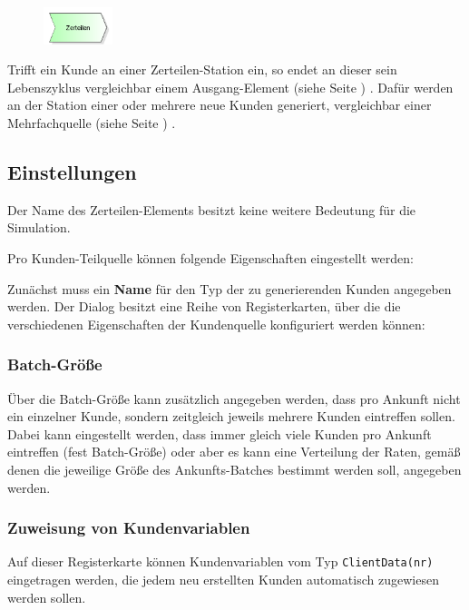 \begin{figure}
\vspace{-22pt}
\includegraphics[width=2cm]{imageModelElementSplit.png}
\vspace{-22pt}
\end{figure}

Trifft ein Kunde an einer Zerteilen-Station ein, so endet an dieser sein
Lebenszyklus vergleichbar einem Ausgang-Element (siehe Seite \pageref{ref:ModelElementDispose}) .
Dafür werden an der Station einer oder mehrere neue Kunden generiert, vergleichbar
einer Mehrfachquelle (siehe Seite \pageref{ref:ModelElementSourceMulti}) .

\subsection*{Einstellungen}

Der Name des Zerteilen-Elements besitzt keine weitere Bedeutung für die Simulation.

Pro Kunden-Teilquelle können folgende Eigenschaften eingestellt werden: 

Zunächst muss ein \textbf{Name} für den Typ der zu generierenden Kunden angegeben werden.
Der Dialog besitzt eine Reihe von Registerkarten, über die die verschiedenen Eigenschaften
der Kundenquelle konfiguriert werden können:

\subsubsection*{Batch-Größe}

Über die Batch-Größe kann zusätzlich
angegeben werden, dass pro Ankunft nicht ein einzelner Kunde, sondern zeitgleich jeweils
mehrere Kunden eintreffen sollen. Dabei kann eingestellt werden, dass immer gleich
viele Kunden pro Ankunft eintreffen (fest Batch-Größe) oder aber es kann eine Verteilung
der Raten, gemäß denen die jeweilige Größe des Ankunfts-Batches bestimmt werden soll,
angegeben werden.

\subsubsection*{Zuweisung von Kundenvariablen}

Auf dieser Registerkarte können Kundenvariablen vom Typ \texttt{ClientData(nr)} eingetragen werden,
die jedem neu erstellten Kunden automatisch zugewiesen werden sollen.

